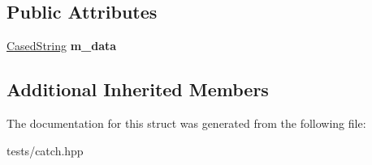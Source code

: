 \subsection*{Public Attributes}
\begin{DoxyCompactItemize}
\item 
\mbox{\label{struct_catch_1_1_matchers_1_1_impl_1_1_std_string_1_1_starts_with_accaace83106244c635d251addb028125}} 
\hyperlink{struct_catch_1_1_matchers_1_1_impl_1_1_std_string_1_1_cased_string}{Cased\+String} {\bfseries m\+\_\+data}
\end{DoxyCompactItemize}
\subsection*{Additional Inherited Members}


The documentation for this struct was generated from the following file\+:\begin{DoxyCompactItemize}
\item 
tests/catch.\+hpp\end{DoxyCompactItemize}
